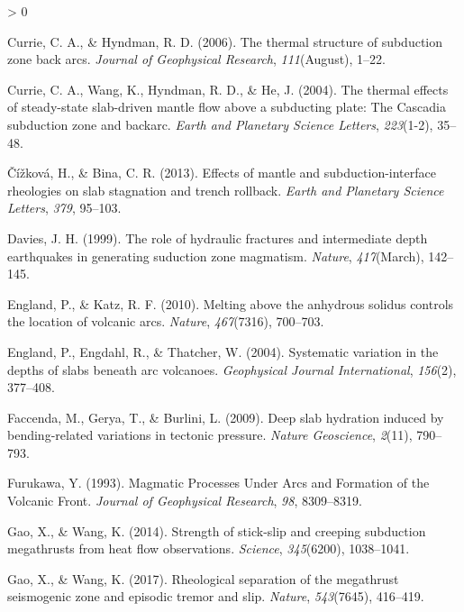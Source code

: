 \documentclass[draft,linenumbers]{agujournal2018}
\newlength{\cslhangindent}
\newenvironment{CSLReferences}[2] %
 {%
  \setlength{\parindent}{0pt}
  \ifodd #1 \everypar{\setlength{\hangindent}{\cslhangindent}}\ignorespaces\fi
  \ifnum #2 > 0
  \setlength{\parskip}{#2\baselineskip}
  \fi
 }%
 {}
\begin{document}
\begin{CSLReferences}{1}{0}
\leavevmode{}%
Currie, C. A., \& Hyndman, R. D. (2006). {The thermal structure of
subduction zone back arcs}. \emph{Journal of Geophysical Research},
\emph{111}(August), 1--22.

\leavevmode{}%
Currie, C. A., Wang, K., Hyndman, R. D., \& He, J. (2004). {The thermal
effects of steady-state slab-driven mantle flow above a subducting
plate: The Cascadia subduction zone and backarc}. \emph{Earth and
Planetary Science Letters}, \emph{223}(1-2), 35--48.

\leavevmode{}%
Čížková, H., \& Bina, C. R. (2013). {Effects of mantle and
subduction-interface rheologies on slab stagnation and trench rollback}.
\emph{Earth and Planetary Science Letters}, \emph{379}, 95--103.

\leavevmode{}%
Davies, J. H. (1999). {The role of hydraulic fractures and intermediate
depth earthquakes in generating suduction zone magmatism}.
\emph{Nature}, \emph{417}(March), 142--145.

\leavevmode{}%
England, P., \& Katz, R. F. (2010). Melting above the anhydrous solidus
controls the location of volcanic arcs. \emph{Nature}, \emph{467}(7316),
700--703.

\leavevmode{}%
England, P., Engdahl, R., \& Thatcher, W. (2004). {Systematic variation
in the depths of slabs beneath arc volcanoes}. \emph{Geophysical Journal
International}, \emph{156}(2), 377--408.

\leavevmode{}%
Faccenda, M., Gerya, T., \& Burlini, L. (2009). {Deep slab hydration
induced by bending-related variations in tectonic pressure}.
\emph{Nature Geoscience}, \emph{2}(11), 790--793.

\leavevmode{}%
Furukawa, Y. (1993). {Magmatic Processes Under Arcs and Formation of the
Volcanic Front}. \emph{Journal of Geophysical Research}, \emph{98},
8309--8319.

\leavevmode{}%
Gao, X., \& Wang, K. (2014). {Strength of stick-slip and creeping
subduction megathrusts from heat flow observations}. \emph{Science},
\emph{345}(6200), 1038--1041.

\leavevmode{}%
Gao, X., \& Wang, K. (2017). {Rheological separation of the megathrust
seismogenic zone and episodic tremor and slip}. \emph{Nature},
\emph{543}(7645), 416--419.


\end{CSLReferences}
\end{document}
